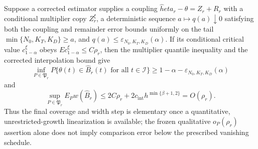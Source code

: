 Suppose a corrected estimator supplies a coupling \(\widehat  heta_r-\theta=Z_r+R_r\) with a conditional multiplier copy \(Z_r^\xi\), a deterministic sequence \(a\mapsto q(a)\downarrow0\) satisfying both the coupling and remainder error bounds uniformly on the tail \(\min\{N_0,K_T,K_D\}\ge a\), and \(q(a)\le\varepsilon_{N_0,K_T,K_D}(\alpha)\).  If its conditional critical value \(c_{1-\alpha}^\xi\) obeys \(E c_{1-\alpha}^\xi\le C\rho_r\), then the multiplier quantile inequality and the corrected interpolation bound give
\[
 \inf_{P\in\mathfrak P_r}P\{\theta(t)\in\widehat B_r(t)
 \text{ for all }t\in\mathcal I\}
 \ge1-\alpha-\varepsilon_{N_0,K_T,K_D}(\alpha)
\]
and
\[
 \sup_{P\in\mathfrak P_r}E_Pw(\widehat B_r)
 \le2C\rho_r+2c_{\mathrm{int}}h^{\min\{\beta+1,2\}}=O(\rho_r).
\]
Thus the final coverage and width step is elementary once a quantitative, unrestricted-growth linearization is available; the frozen qualitative \(o_P(\rho_r)\) assertion alone does not imply comparison error below the prescribed vanishing schedule.